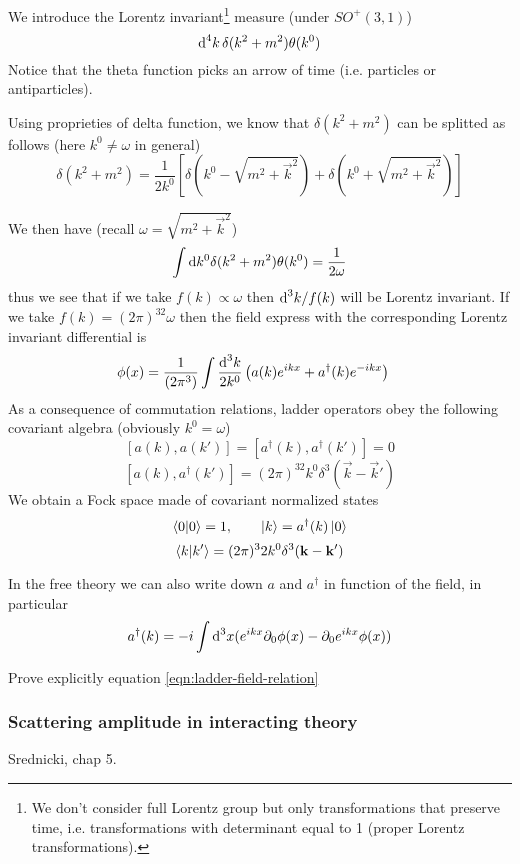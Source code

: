 \documentclass[../main/main.tex]{subfiles}
\begin{document}
We introduce the Lorentz invariant\footnote{We don't consider full Lorentz group but only transformations that preserve time, i.e. transformations with determinant equal to 1 (proper Lorentz transformations).} measure (under $SO^+(3,1)$)
\[\textup{d}^4k\,\delta(k^2+m^2)\theta(k^0)\]
{\small Notice that the theta function picks an arrow of time (i.e. particles or antiparticles).}

Using proprieties of delta function, we know that $\delta(k^2+m^2)$ can be splitted as follows (here $k^0\ne\omega$ in general)
\[\delta (k^2+m^2)=\frac1{2k^0}\left[\delta\left(k^0-\sqrt{m^2+\vec k^2}\right)+\delta\left(k^0+\sqrt{m^2+\vec k^2}\right)\right]\]

We then have (recall $\omega=\sqrt{m^2+\vec k^2}$)
\[\int\textup{d} k^0\delta(k^2+m^2)\theta(k^0)=\frac1{2\omega}\]
thus we see that if we take $f(k)\propto\omega$ then $\textup{d}^3k/f(k)$ will be Lorentz invariant. If we take $f(k)=(2\pi)^32\omega$ then the field express with the corresponding Lorentz invariant differential is
\begin{align*}
\phi(x)
&=\frac1{(2\pi^3)}\int\frac{\textup{d}^3 k}{2k^0}\left(a(k)e^{ikx}+a^\dagger(k)e^{-ikx}\right)
\end{align*}
As a consequence of commutation relations, ladder operators obey the following covariant algebra (obviously $k^0=\omega$)
\[[a(k),a(k')]=[a^\dagger(k),a^\dagger(k')]=0\]
\[[a(k),a^\dagger(k')]=(2\pi)^32k^0\delta^3(\vec k-\vec k')\]
We obtain a Fock space made of covariant normalized states
\[\braket0=1,\qquad\ket k=a^\dagger(k)\ket0\]
\[\braket{k}{k'}=(2\pi)^32k^0\delta^3(\mathbf k-\mathbf k')\]


In the free theory we can also write down $a$ and $a^\dagger$ in function of the field, in particular
\begin{equation}\label{eqn:ladder-field-relation}
a^\dagger(k)=-i\int\textup{d}^3x(e^{ikx}\partial_0\phi(x)-\partial_0e^{ikx}\phi(x))
\end{equation}

\begin{exercise}
Prove explicitly equation \eqref{eqn:ladder-field-relation}
\end{exercise}


\subsubsection{Scattering amplitude in interacting theory}
\textsf{Srednicki, chap 5}.\\
\end{document}
